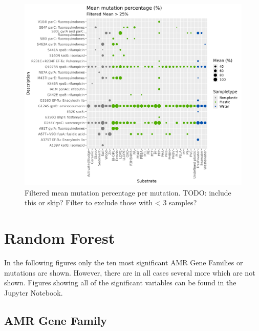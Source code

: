 \begin{figure}[h]
    \centering
    \includegraphics[width = \textwidth]{figure/relative_mean_points_25.png}
    \caption{Filtered mean mutation percentage per mutation. TODO: include this or skip? Filter to exclude those with < 3 samples?}
    \label{pointplot_mutations}
\end{figure}


\section{Random Forest}
%
In the following figures only the ten most significant AMR Gene Families or mutations are shown. However, there are in all cases several more which are not shown. Figures showing all of the significant variables can be found in the Jupyter Notebook. 

\subsection{AMR Gene Family}
